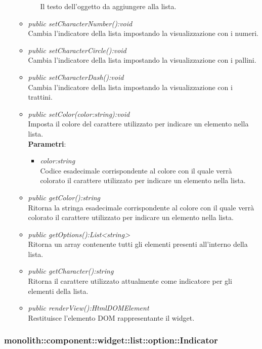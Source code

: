 \begin{itemize}
\begin{itemize}
\begin{itemize}
		Il testo dell'oggetto da aggiungere alla lista.
		\end{itemize} 
	\item \textit{public setCharacterNumber():void}\\
	Cambia l'indicatore della lista impostando la visualizzazione con i numeri.
	\item \textit{public setCharacterCircle():void}\\
	Cambia l'indicatore della lista impostando la visualizzazione con i pallini.
	\item \textit{public setCharacterDash():void}\\
	Cambia l'indicatore della lista impostando la visualizzazione con i trattini.
	\item \textit{public setColor(color:string):void}\\
		Imposta il colore del carattere utilizzato per indicare un elemento nella lista.
		\\ \textbf{Parametri}: \begin{itemize}
		\item \textit{color:string}\\
		Codice esadecimale corrispondente al colore con il quale verrà colorato il carattere utilizzato per indicare un elemento nella lista.
		\end{itemize} 
	\item \textit{public getColor():string}\\
	Ritorna la stringa esadecimale corrispondente al colore con il quale verrà colorato il carattere utilizzato per indicare un elemento nella lista.
	\item \textit{public getOptions():List<string>}\\
	Ritorna un array contenente tutti gli elementi presenti all'interno della lista.
	\item \textit{public getCharacter():string}\\
	Ritorna il carattere utilizzato attualmente come indicatore per gli elementi della lista.
	\item \textit{public renderView():HtmlDOMElement}\\
	Restituisce l'elemento DOM rappresentante il widget.
	\end{itemize}
\end{itemize}

\subsubsection{monolith::component::widget::list::option::Indicator}

